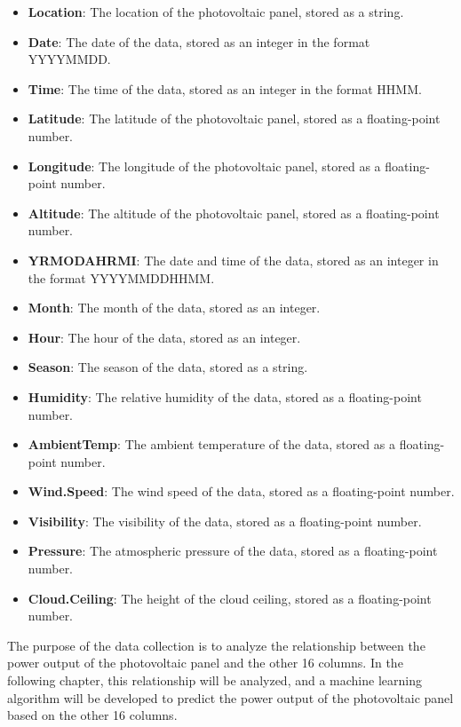 \documentclass{report}
\begin{document}
\begin{itemize}
    \item \textbf{Location}: The location of the photovoltaic panel, stored as a string.
    \item \textbf{Date}: The date of the data, stored as an integer in the format YYYYMMDD.
    \item \textbf{Time}: The time of the data, stored as an integer in the format HHMM.
    \item \textbf{Latitude}: The latitude of the photovoltaic panel, stored as a floating-point number.
    \item \textbf{Longitude}: The longitude of the photovoltaic panel, stored as a floating-point number.
    \item \textbf{Altitude}: The altitude of the photovoltaic panel, stored as a floating-point number.
    \item \textbf{YRMODAHRMI}: The date and time of the data, stored as an integer in the format YYYYMMDDHHMM.
    \item \textbf{Month}: The month of the data, stored as an integer.
    \item \textbf{Hour}: The hour of the data, stored as an integer.
    \item \textbf{Season}: The season of the data, stored as a string.
    \item \textbf{Humidity}: The relative humidity of the data, stored as a floating-point number.
    \item \textbf{AmbientTemp}: The ambient temperature of the data, stored as a floating-point number.
    \item \textbf{Wind.Speed}: The wind speed of the data, stored as a floating-point number.
    \item \textbf{Visibility}: The visibility of the data, stored as a floating-point number.
    \item \textbf{Pressure}: The atmospheric pressure of the data, stored as a floating-point number.
    \item \textbf{Cloud.Ceiling}: The height of the cloud ceiling, stored as a floating-point number.
\end{itemize}
The purpose of the data collection is to analyze the relationship between the power output of the photovoltaic panel and the other 16 columns. In the following chapter, this relationship will be analyzed, and a machine learning algorithm will be developed to predict the power output of the photovoltaic panel based on the other 16 columns.
\end{document}

